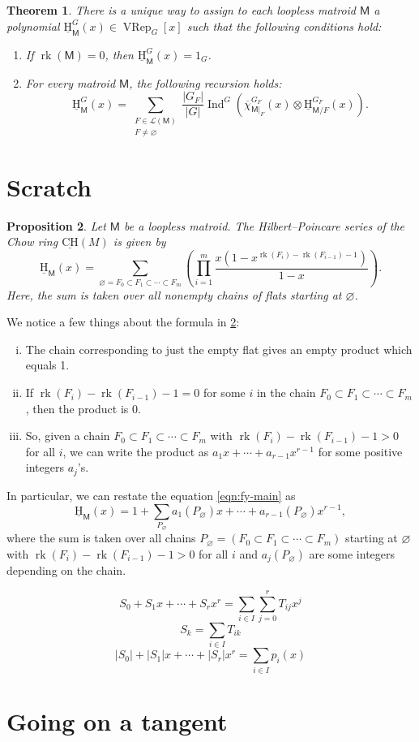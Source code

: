 \documentclass[10pt, a4paper, english]{amsart}
\theoremstyle{teoremas}
\newtheorem{theorem}{Theorem}[section]
\newtheorem{proposition}[theorem]{Proposition}
\theoremstyle{definition}
\DeclareMathOperator{\rk}{rk}
\newcommand{\M}{\mathsf{M}}
\newcommand{\uH}{\underline{\mathrm{H}}}
\newcommand{\uCH}{\underline{\mathrm{CH}}}
\newcommand{\VRep}{\operatorname{VRep}}
\newcommand{\Ind}{\operatorname{Ind}}
\begin{document}
\begin{theorem}\label{thm:equiv-main}
    There is a unique way to assign to each loopless matroid $\M$  a polynomial $\uH_{\M}^G(x)\in \VRep_G[x]$ such that the following conditions hold:
    \begin{enumerate}[\normalfont(i)]
        \item If $\rk(\M) = 0$, then $\uH_{\M}^G(x) = 1_G$.
        \item For every matroid $\M$, the following recursion holds:
            \[ \uH_{\M}^G(x) = \sum_{\substack{F\in\mathcal{L}(\M)\\ F\neq\varnothing}} \frac{|G_F|}{|G|}\Ind^G\left(\overline{\chi}_{\M|_F}^{G_F}(x)\otimes \uH_{\M/F}^{G_F}(x)\right).\]
    \end{enumerate}
\end{theorem}

\section{Scratch}

\begin{proposition}\label{prop:fy-main}
    Let $\M$ be a loopless matroid. The Hilbert--Poincare series of the Chow ring $\uCH(M)$ is given by
    \begin{equation}\label{eqn:fy-main}
        \uH_{\M}(x) = \sum_{\varnothing = F_0\subset F_1\subset\cdots\subset F_m}
        \left(\prod_{i=1}^{m}{\frac{x(1-x^{\rk(F_i)-\rk(F_{i-1})-1})}{1-x}}\right).
    \end{equation}
    Here, the sum is taken over all nonempty chains of flats starting at $\varnothing$.
\end{proposition}
We notice a few things about the formula in \ref*{prop:fy-main}:
\begin{enumerate}[(i)]
    \item The chain corresponding to just the empty flat gives an empty product which equals 1.
    \item If $\rk(F_i)-\rk(F_{i-1})-1 = 0$ for some $i$ in the chain $F_0\subset F_1\subset\cdots\subset F_m$, then the product is 0.
    \item So, given a chain $F_0\subset F_1\subset\cdots\subset F_m$ with $\rk(F_i)-\rk(F_{i-1})-1 > 0$ for all $i$, we can write the product as
        $a_1x+\cdots+a_{r-1}x^{r-1}$ for some positive integers $a_j$'s.
\end{enumerate}

In particular, we can restate the equation \ref*{eqn:fy-main} as
    $$\uH_{\M}(x) = 1 + \sum_{P_\varnothing}
    {a_1(P_\varnothing)x+\cdots+a_{r-1}(P_\varnothing)x^{r-1}},$$
where the sum is taken over all chains $P_\varnothing = (F_0\subset F_1\subset\cdots\subset F_m)$ starting at $\varnothing$ with $\rk(F_i)-\rk(F_{i-1})-1 > 0$ for all $i$ and
$a_j(P_\varnothing)$ are some integers depending on the chain.

$$S_0+S_1x+\cdots+S_rx^r = \sum_{i\in I}{\sum_{j=0}^{r}{T_{ij}x^j}}$$
$$S_k = \sum_{i\in I}{T_{ik}}$$
$$|S_0|+|S_1|x+\cdots+|S_r|x^r =\sum_{i\in I}{p_i(x)}$$

\section{Going on a tangent}





\end{document}
